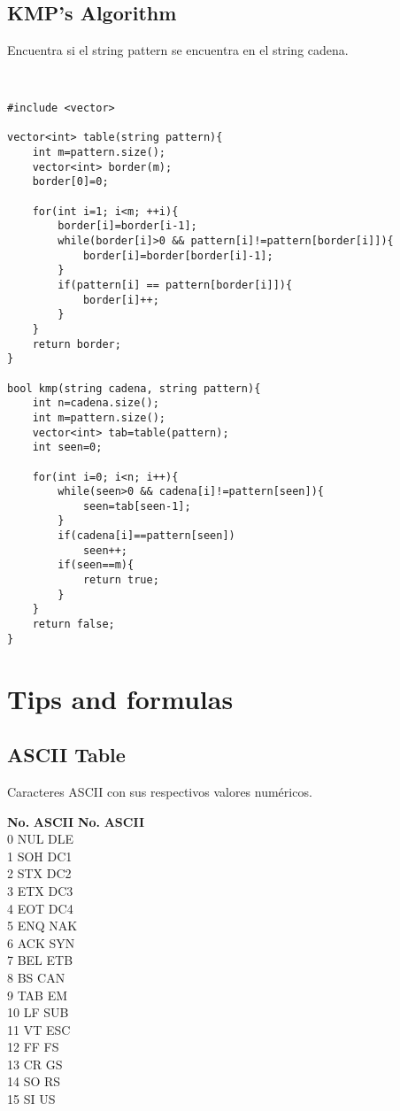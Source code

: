 \documentclass[11pt,letterpaper,twocolumn,twosided]{article}
\begin{document}
\subsection{KMP's Algorithm}
Encuentra si el string pattern se encuentra en el string cadena.
\begin{lstlisting}


#include <vector>

vector<int> table(string pattern){
	int m=pattern.size();
	vector<int> border(m);
	border[0]=0;

	for(int i=1; i<m; ++i){
		border[i]=border[i-1];
		while(border[i]>0 && pattern[i]!=pattern[border[i]]){
			border[i]=border[border[i]-1];
		}
		if(pattern[i] == pattern[border[i]]){
			border[i]++;
		}
	}
	return border;
}

bool kmp(string cadena, string pattern){
	int n=cadena.size();
	int m=pattern.size();
	vector<int> tab=table(pattern);
	int seen=0;

	for(int i=0; i<n; i++){
		while(seen>0 && cadena[i]!=pattern[seen]){
			seen=tab[seen-1];
		}
		if(cadena[i]==pattern[seen])
			seen++;
		if(seen==m){
			return true;
		}
	}
	return false;
}
\end{lstlisting}

\section{Tips and formulas}

\subsection{ASCII Table}
Caracteres ASCII con sus respectivos valores num\'ericos.


\begin{tabbing}
\textbf{No.}\hspace{1cm} \=  \textbf{ASCII}\hspace{2cm} \= \textbf{No.}\hspace{1cm} \= \textbf{ASCII}\hspace{2cm}  \\ 
0 \> NUL  \> DLE \\
1 \> SOH  \> DC1 \\
2 \> STX  \> DC2 \\
3 \> ETX  \> DC3 \\
4 \> EOT  \> DC4 \\
5 \> ENQ  \> NAK \\
6 \> ACK  \> SYN \\
7 \> BEL  \> ETB \\
8 \> BS  \> CAN \\
9 \> TAB  \> EM \\
10 \> LF  \> SUB \\
11 \> VT  \> ESC \\
12 \> FF  \> FS \\
13 \> CR  \> GS \\
14 \> SO  \> RS \\
15 \> SI  \> US \\ 
\end{tabbing}
\end{document}
